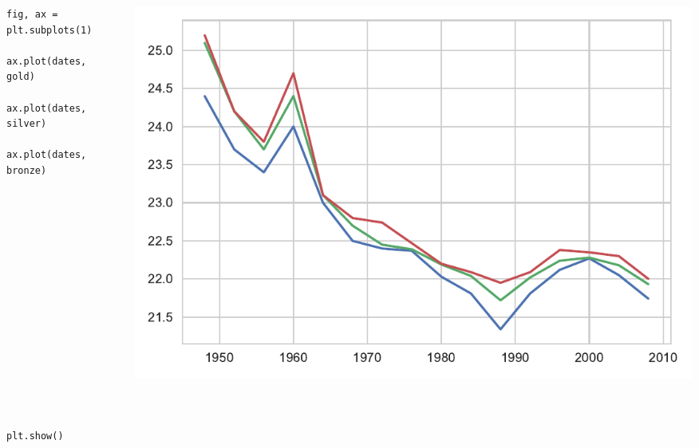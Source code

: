 \documentclass{beamer}
\begin{document}
\begin{frame}[fragile]
\tiny{
\begin{columns}
\begin{column}{0.45\textwidth}
\begin{verbatim}
fig, ax = plt.subplots(1)

ax.plot(dates, gold)

ax.plot(dates, silver)

ax.plot(dates, bronze)
















plt.show()
\end{verbatim}
\end{column}
\begin{column}{0.55\textwidth}
\includegraphics[width=\textwidth]{olympics_1.pdf}
\end{column}
\end{columns}
}
\end{frame}
\end{document}
